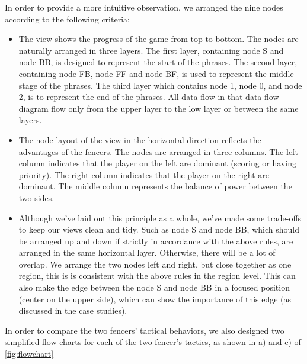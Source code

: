 \documentclass[journal]{vgtc}                %
\begin{document}
In order to provide a more intuitive observation, we arranged the nine nodes according to the following criteria:
\begin{itemize}
	\item The view shows the progress of the game from top to bottom.
	The nodes are naturally arranged in three layers.
	The first layer, containing node S and node BB, is designed to represent the start of the phrases.
	The second layer, containing node FB, node FF and node BF, is used to represent the middle stage of the phrases.
	The third layer which contains node 1, node 0, and node 2, is to represent the end of the phrases.
	All data flow in that data flow diagram flow only from the upper layer to the low layer or between the same layers.
	\item The node layout of the view in the horizontal direction reflects the advantages of the fencers.
	The nodes are arranged in three columns.
	The left column indicates that the player on the left are dominant (scoring or having priority).
	The right column indicates that the player on the right are dominant.
	The middle column represents the balance of power between the two sides.
	\item Although we've laid out this principle as a whole, we've made some trade-offs to keep our views clean and tidy.
	Such as node S and node BB, which should be arranged up and down if strictly in accordance with the above rules, are arranged in the same horizontal layer. 
	Otherwise, there will be a lot of overlap.
	We arrange the two nodes left and right, but close together as one region, this is is consistent with the above rules in the region level.
	This can also make the edge between the node S and node BB in a focused position (center on the upper side), which can show the importance of this edge (as discussed in the case studies).
	
\end{itemize}
In order to compare the two fencers' tactical behaviors, we also designed two simplified flow charts for each of the two fencer's tactics, as shown in a) and c) of \autoref{fig:flowchart}
\end{document}
